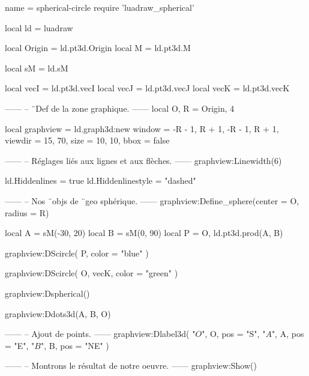 \documentclass[border = 3pt]{standalone}
\begin{document}
\begin{luadraw*}{name = spherical-circle}
require 'luadraw_spherical'

local ld = luadraw

local Origin = ld.pt3d.Origin
local M      = ld.pt3d.M

local sM = ld.sM

local vecI = ld.pt3d.vecI
local vecJ = ld.pt3d.vecJ
local vecK = ld.pt3d.vecK

------
-- ¨Def de la zone graphique.
------
local O, R = Origin, 4

local graphview = ld.graph3d:new{
  window  = {-R - 1, R + 1, -R - 1, R + 1},
  viewdir = {15, 70},
  size    = {10, 10},
  bbox    = false
}

------
-- Réglages liés aux lignes et aux flèches.
------
graphview:Linewidth(6)

ld.Hiddenlines     = true
ld.Hiddenlinestyle = "dashed"

------
-- Nos ¨objs de ¨geo sphérique.
------
graphview:Define_sphere({center = O, radius = R})

local A = sM(-30, 20)
local B = sM(0, 90)
local P = {O, ld.pt3d.prod(A, B)}

graphview:DScircle(
  P,
  {color = "blue"}
)

graphview:DScircle(
  {O, vecK},
  {color = "green"}
)

graphview:Dspherical()

graphview:Ddots3d({A, B, O})

------
-- Ajout de points.
------
graphview:Dlabel3d(
  "$O$", O, {pos = "S"},
  "$A$", A, {pos = "E"},
  "$B$", B, {pos = "NE"}
)

------
-- Montrons le résultat de notre oeuvre.
------
graphview:Show()
\end{luadraw*}
\end{document}
